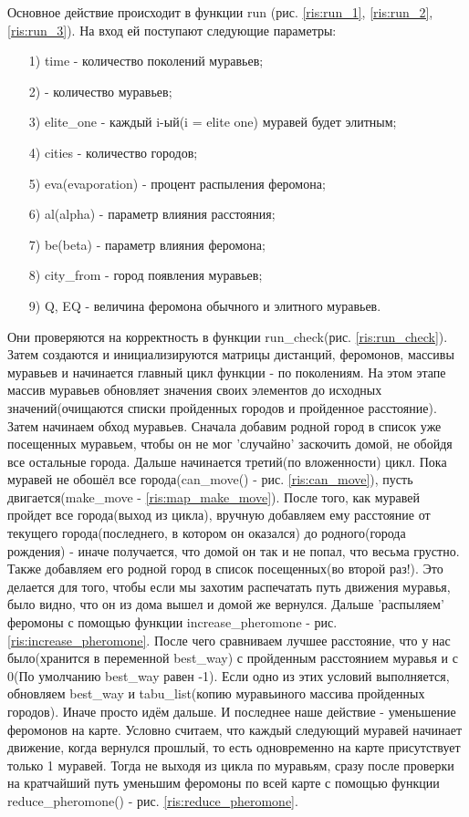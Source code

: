 \documentclass[a4paper, 14pt]{article}
\begin{document}
\hspace{1cm} Основное действие происходит в функции run (рис. \ref{ris:run_1}, \ref{ris:run_2}, \ref{ris:run_3}). На вход ей поступают следующие параметры:
	\begin{enumerate}
	\item[1)] time - количество поколений муравьев;
    \item[2)]  - количество муравьев;
    \item[3)] elite\_one - каждый i-ый(i = elite one) муравей будет элитным;
    \item[4)] cities - количество городов;
    \item[5)] eva(evaporation) - процент распыления феромона;
    \item[6)] al(alpha) - параметр влияния расстояния;
    \item[7)] be(beta) - параметр влияния феромона;
    \item[8)] city\_from - город появления муравьев;
    \item[9)] Q, EQ - величина феромона обычного и элитного муравьев.
    \end{enumerate}
Они проверяются на корректность в функции run\_check(рис. \ref{ris:run_check}). Затем создаются и инициализируются матрицы дистанций, феромонов, массивы муравьев и начинается главный цикл функции - по поколениям. На этом этапе массив муравьев обновляет значения своих элементов до исходных значений(очищаются списки пройденных городов и пройденное расстояние). Затем начинаем обход муравьев. Сначала добавим родной город в список уже посещенных муравьем, чтобы он не мог 'случайно' заскочить домой, не обойдя все остальные города. Дальше начинается третий(по вложенности) цикл. Пока муравей не обошёл все города(can\_move() - рис. \ref{ris:can_move}), пусть двигается(make\_move - \ref{ris:map_make_move}). После того, как муравей пройдет все города(выход из цикла), вручную добавляем ему расстояние от текущего города(последнего, в котором он оказался) до родного(города рождения) - иначе получается, что домой он так и не попал, что весьма грустно. Также добавляем его родной город в список посещенных(во второй раз!). Это делается для того, чтобы если мы захотим распечатать путь движения муравья, было видно, что он из дома вышел и домой же вернулся. Дальше 'распыляем' феромоны с помощью функции increase\_pheromone - рис. \ref{ris:increase_pheromone}. После чего сравниваем лучшее расстояние, что у нас было(хранится в переменной best\_way) с пройденным расстоянием муравья и с 0(По умолчанию best\_way равен -1). Если одно из этих условий выполняется, обновляем best\_way и tabu\_list(копию муравьиного массива пройденных городов). Иначе просто идём дальше. И последнее наше действие - уменьшение феромонов на карте. Условно считаем, что каждый следующий муравей начинает движение, когда вернулся прошлый, то есть одновременно на карте присутствует только 1 муравей. Тогда не выходя из цикла по муравьям, сразу после проверки на кратчайший путь уменьшим феромоны по всей карте с помощью функции  reduce\_pheromone() - рис. \ref{ris:reduce_pheromone}.
\newpage
\end{document}
